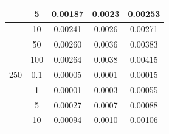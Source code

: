 \begin{table}[H]
\begin{center}
{\begin{tabular}{|c|c|c|c|c|}
    &    5    &    0.00187    &    0.0023    &    0.00253    \\ \hline
    &    10    &    0.00241    &    0.0026    &    0.00271    \\ \hline
    &    50    &    0.00260    &    0.0036    &    0.00383    \\ \hline
    &    100    &    0.00264    &    0.0038    &    0.00415    \\ \hline
250    &    0.1    &    0.00005    &    0.0001    &    0.00015    \\ \hline
    &    1    &    0.00001    &    0.0003    &    0.00055    \\ \hline
    &    5    &    0.00027    &    0.0007    &    0.00088    \\ \hline
    &    10    &    0.00094    &    0.0010    &    0.00106    \\ \hline
\end{tabular} 
}
\end{center}
\end{table}


